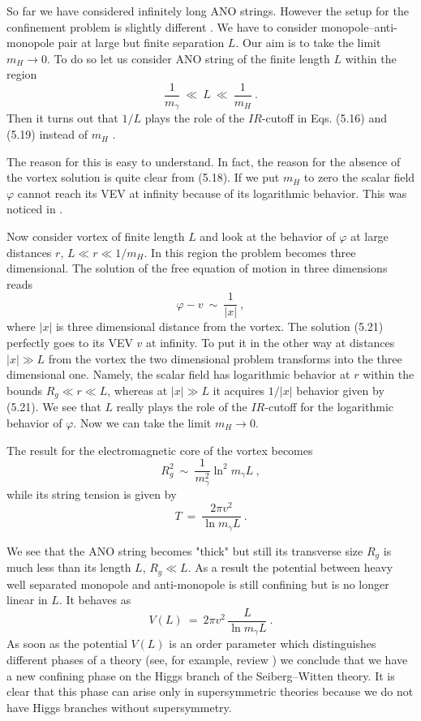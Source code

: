 \documentclass[a4paper,12pt]{article}
\begin{document}
So far we have considered infinitely long ANO strings. However
the setup for the confinement problem is slightly different
\cite{Y}. We have to consider monopole--anti-monopole pair at
large but finite separation $L$. Our aim is to take the limit
$m_H\to0$. To do so let us consider ANO string of the finite
length $L$ within the region
\begin{equation}
\frac1{m_\gamma}\ \ll\ L\ \ll\ \frac1{m_H}\ .
\end{equation}
Then it turns out that $1/L$ plays the role of the $IR$-cutoff
 in Eqs. (5.16) and (5.19) instead of $m_H$ \cite{Y}.

The reason for this is easy to understand. In fact, the reason
for the absence of the vortex solution is quite clear from
(5.18). If we put $m_H$ to zero the scalar field $\varphi$
cannot reach its VEV at infinity because of its logarithmic
behavior. This was noticed in \cite{R}.

Now consider vortex of finite length $L$ and look at the
behavior of $\varphi$ at large distances $r$, $L\ll r\ll1/m_H$.
In this region the problem becomes three dimensional. The
solution of the free equation of motion in three dimensions
reads
\begin{equation}
\varphi-v\ \sim\ \frac1{|x|}\ ,
\end{equation}
where $|x|$ is three dimensional distance from the vortex. The
solution (5.21) perfectly goes to its VEV $v$ at infinity. To
put it in the other way at distances $|x|\gg L$ from the vortex
the two dimensional problem transforms into the three dimensional one.
Namely, the scalar field has logarithmic behavior at $r$ within the 
bounds  $R_g\ll r\ll L$, whereas at $|x|\gg L$ it acquires $1/|x|$
behavior given by (5.21).
We see that $L$ really plays the role of the $IR$-cutoff for the
logarithmic behavior of $\varphi$. Now we can take the limit $m_H\to 0$.


The result for the electromagnetic core of the vortex becomes
\cite{Y}
\begin{equation}
R^2_g\ \sim\ \frac1{m^2_\gamma}\ln^2m_\gamma L\ ,
\end{equation}
while its string tension is given by \cite{Y}
\begin{equation}
T\ =\ \frac{2\pi v^2}{\ln m_\gamma L}\ .
\end{equation}

We see that the ANO string becomes "thick" but still its
transverse size $R_g$ is much less than its length $L$, $R_g\ll
L$. As a result the potential between heavy well separated
monopole and anti-monopole is still  confining but is
no longer linear in $L$. It behaves
as \cite{Y}
\begin{equation}
V(L)\ =\ 2\pi v^2\, \frac L{\ln m_\gamma L}\ .
\end{equation}
 As soon as the
potential $V(L)$ is an order parameter which distinguishes 
different phases of a theory
(see, for example, review
\cite{IS}) we conclude that we have a new confining phase on the
Higgs branch of the Seiberg--Witten theory. It is clear that
this phase can arise only in supersymmetric theories
because we do not have Higgs branches without supersymmetry.
\end{document}
